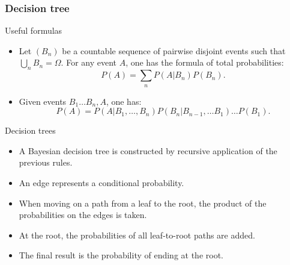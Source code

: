 \begin{frame}
    \frametitle{Decision tree}
    \begin{block}{Useful formulas}
    \begin{itemize}
        \item<+-> Let $\left(B_n\right)$ be a countable sequence of pairwise disjoint events such that $\bigcup_n B_n = \Omega.$ For any event $A$,
        one has the formula of total probabilities:
        \begin{equation}
            P\left( A \right) = \sum_n P\left( A \vert B_n \right) P\left( B_n \right).
        \end{equation}
        \item<+-> Given events $B_1 \dots B_n, A$, one has:
        \begin{equation}
            P\left( A \right) = P\left( A \vert B_1, \dots, B_n \right)P(B_n \vert B_{n-1}, \dots B_1)\dots P\left( B_1 \right).
        \end{equation}
       \end{itemize}
    \end{block}
    \begin{block}{Decision trees}
        \begin{itemize}
            \item<+-> A Bayesian decision tree is constructed by recursive application of the previous rules. 
            \item<+-> An edge represents a conditional probability.
            \item<+-> When moving on a path from a leaf to the root, the product of the probabilities on the edges is taken.
            \item<+-> At the root, the probabilities of all leaf-to-root paths are added.
            \item<+-> The final result is the probability of ending at the root.
        \end{itemize}
    \end{block}
\end{frame}
